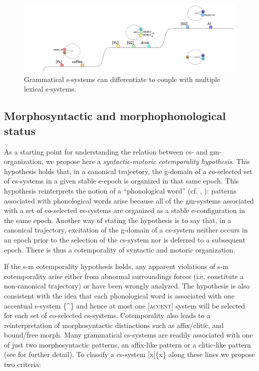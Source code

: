 \begin{enumerate}
  
\begin{figure}
\includegraphics[width=\textwidth]{figures/Tilsen-img67.png}
\caption{Grammatical s-systems can differentiate to couple with multiple lexical s-systems.}
\label{fig:4:17}
\end{figure}
\end{enumerate}
 

\subsection{Morphosyntactic and morphophonological status}

As a starting point for understanding the relation between cs- and gm-organization, we propose here a \textit{syntactic-motoric cotemporality hypothesis}. This hypothesis holds that, in a canonical trajectory, the g-domain of a co-selected set of cs-systems in a given stable e-epoch is organized in that same epoch. This hypothesis reinterprets the notion of a “phonological word” (cf. \citealt{NesporVogel1986}, \citealt{Selkirk1984,Selkirk2011}): patterns associated with phonological words arise because all of the gm-systems associated with a set of co-selected cs-systems are organized as a stable e-configuration in the same epoch. Another way of stating the hypothesis is to say that, in a canonical trajectory, excitation of the g-domain of a cs-system neither occurs in an epoch prior to the selection of the cs-system nor is deferred to a subsequent epoch. There is thus a cotemporality of syntactic and motoric organization. 

  If the s-m cotemporality hypothesis holds, any apparent violations of s-m cotemporality arise either from abnormal surroundings forces (i.e. constitute a non-canonical trajectory) or have been wrongly analyzed. The hypothesis is also consistent with the idea that each phonological word is associated with one accentual s-system \{\^{}\} and hence at most one [\textsc{accent}] system will be selected for each set of co-selected cs-systems. Cotemporality also leads to a reinterpretation of morphosyntactic distinctions such as affix/clitic, and bound/free morph. Many grammatical cs-systems are readily associated with one of just two morphosyntactic patterns, an affix-like pattern or a clitic-like pattern (see \citealt{Payne1997,Zwicky1985,ZwickyPullum1983} for further detail). To classify a cs-system [x]\{x\} along these lines we propose two criteria:\\


